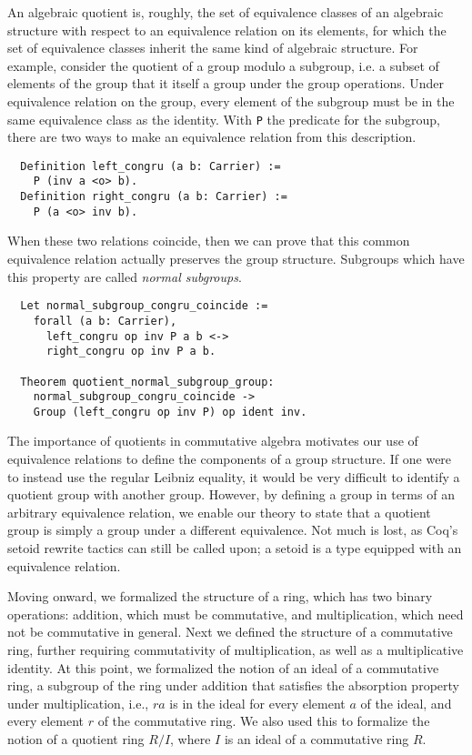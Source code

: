 \documentclass{article}
\begin{document}
An algebraic quotient is, roughly, the set of equivalence classes of an algebraic structure with respect to an equivalence relation on its elements, for which the set of equivalence classes inherit the same kind of algebraic structure. 
For example, consider the quotient of a group modulo a subgroup, i.e. a subset of elements of the group that it itself a group under the group operations. 
Under equivalence relation on the group, every element of the subgroup must be in the same equivalence class as the identity.  
With \texttt{P} the predicate for the subgroup, there are two ways to
make an equivalence relation from this description.

\begin{verbatim}
  Definition left_congru (a b: Carrier) :=
    P (inv a <o> b).
  Definition right_congru (a b: Carrier) :=
    P (a <o> inv b).
\end{verbatim}

When these two relations coincide, then we can prove that this common equivalence
relation actually preserves the group structure. Subgroups which have this
property are called \emph{normal subgroups}.

\begin{verbatim}
  Let normal_subgroup_congru_coincide :=
    forall (a b: Carrier),
      left_congru op inv P a b <->
      right_congru op inv P a b.

  Theorem quotient_normal_subgroup_group:
    normal_subgroup_congru_coincide ->
    Group (left_congru op inv P) op ident inv.
\end{verbatim}

The importance of quotients in commutative algebra motivates our use of equivalence relations to define the
components of a group structure. 
If one were to instead use the regular Leibniz equality,
it would be very difficult to identify a quotient group with another
group. 
However, by  defining a group in terms of an arbitrary equivalence relation, we enable our theory to state that a quotient group is
simply a group under a different equivalence. 
Not much is lost,  as Coq's setoid rewrite tactics can still be called upon; 
a setoid is a type equipped
with an equivalence relation.

Moving onward, we formalized the structure of a ring, which has two binary
operations:
addition, which must be commutative, and multiplication, which need not be commutative in general.
Next we defined the structure of a commutative ring, further requiring commutativity of multiplication, as well as a multiplicative identity. 
At this point, we formalized the notion of an ideal of a commutative ring, a subgroup 
of the ring under
addition that satisfies the absorption property under multiplication, i.e., \(r a\) is in
the ideal for every element \(a\) of the ideal, and every element \(r\) of the commutative ring.
We also used this to formalize the notion of a quotient ring $R/I$, where $I$ is an ideal of a commutative ring $R$.
\end{document}
